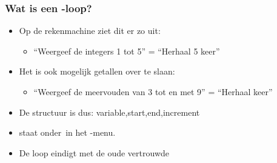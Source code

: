 \begin{frame}
\frametitle{Wat is een -loop?}

\begin{itemize}
  \item<1-> Op de rekenmachine ziet dit er zo uit:
  \begin{itemize}
    \item<1-> ``Weergeef de integers 1 tot 5'' = ``Herhaal  5 keer''
  \end{itemize}
  \item<2-> Het is ook mogelijk getallen over te slaan:
  \begin{itemize}
    \item<2-> ``Weergeef de meervouden van 3 tot en met 9'' = ``Herhaal   keer''
  \end{itemize}
  \item<4-> De structuur is dus: variable,start,end,increment\tifonttxt{)}
  \item<5->  staat onder \tiPRGM\,in het -menu.
  \item<6-> De loop eindigt met de oude vertrouwde 
\end{itemize}

\vspace{2cm}


\end{frame}


